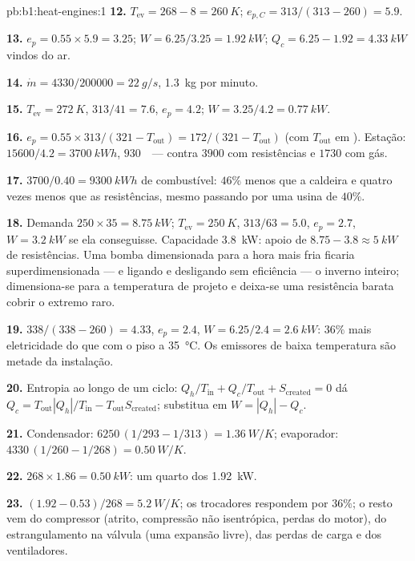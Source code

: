 \begin{solution}{pb:b1:heat-engines:1}
\textbf{12.} $T_{\mathrm{ev}} = 268 - 8 = \qty{260}{K}$; $e_{p,C} = 313/(313 - 260)
= 5.9$.

\textbf{13.} $e_p = 0.55 \times 5.9 = 3.25$; $W = 6.25/3.25 = \qty{1.92}{kW}$;
$Q_c = 6.25 - 1.92 = \qty{4.33}{kW}$ vindos do ar.

\textbf{14.} $\dot m = 4330/200000 = \qty{22}{g/s}$, \qty{1.3}{kg} por minuto.

\textbf{15.} $T_{\mathrm{ev}} = \qty{272}{K}$, $313/41 = 7.6$, $e_p = 4.2$;
$W = 3.25/4.2 = \qty{0.77}{kW}$.

\textbf{16.} $e_p = 0.55 \times 313/(321 - T_{\mathrm{out}}) = 172/(321 -
T_{\mathrm{out}})$ (com $T_{\mathrm{out}}$ em ). Estação: $15600/4.2 =
\qty{3700}{kW h}$, $930$~\texteuro\ --- contra $3900$ com resistências e
$1730$ com gás.

\textbf{17.} $3700/0.40 = \qty{9300}{kW h}$ de combustível: $46\%$ menos que a
caldeira e quatro vezes menos que as resistências, mesmo passando por uma usina
de $40\%$.

\textbf{18.} Demanda $250 \times 35 = \qty{8.75}{kW}$; $T_{\mathrm{ev}} = \qty{250}{K}$,
$313/63 = 5.0$, $e_p = 2.7$, $W = \qty{3.2}{kW}$ se ela conseguisse. Capacidade
\qty{3.8}{kW}: apoio de $8.75 - 3.8 \approx \qty{5}{kW}$ de resistências. Uma bomba
dimensionada para a hora mais fria ficaria superdimensionada --- e ligando e
desligando sem eficiência --- o inverno inteiro; dimensiona-se para a temperatura de
projeto e deixa-se uma resistência barata cobrir o extremo raro.

\textbf{19.} $338/(338 - 260) = 4.33$, $e_p = 2.4$, $W = 6.25/2.4 =
\qty{2.6}{kW}$: $36\%$ mais eletricidade do que com o piso a
\qty{35}{\degreeCelsius}. Os emissores de baixa temperatura são metade da
instalação.

\textbf{20.} Entropia ao longo de um ciclo: $Q_h/T_{\mathrm{in}} + Q_c/T_{\mathrm{out}} +
S_{\mathrm{created}} = 0$ dá $Q_c = T_{\mathrm{out}}|Q_h|/T_{\mathrm{in}} -
T_{\mathrm{out}}S_{\mathrm{created}}$; substitua em $W = |Q_h| - Q_c$.

\textbf{21.} Condensador: $6250\,(1/293 - 1/313) = \qty{1.36}{W/K}$; evaporador:
$4330\,(1/260 - 1/268) = \qty{0.50}{W/K}$.

\textbf{22.} $268 \times 1.86 = \qty{0.50}{kW}$: um quarto dos
\qty{1.92}{kW}.

\textbf{23.} $(1.92 - 0.53)/268 = \qty{5.2}{W/K}$; os trocadores respondem por
$36\%$; o resto vem do compressor (atrito, compressão não isentrópica,
perdas do motor), do estrangulamento na válvula (uma expansão
livre), das perdas de carga e dos ventiladores.


\end{solution}
